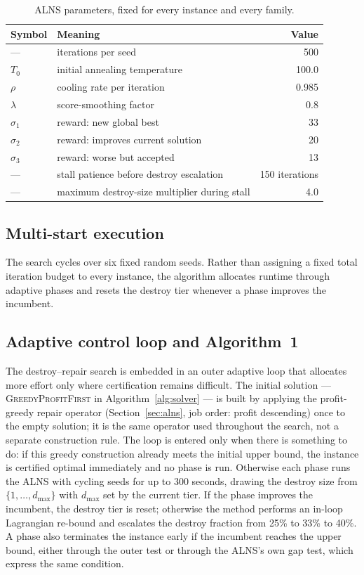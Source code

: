 \documentclass[preprint,12pt]{elsarticle}
\begin{document}
\begin{table}[h]
\centering
\caption{ALNS parameters, fixed for every instance and every family.}
\label{tab:alnsparams}
\begin{tabular}{llr}
\toprule
Symbol & Meaning & Value \\
\midrule
--- & iterations per seed & 500 \\
$T_0$ & initial annealing temperature & 100.0 \\
$\rho$ & cooling rate per iteration & 0.985 \\
$\lambda$ & score-smoothing factor & 0.8 \\
$\sigma_1$ & reward: new global best & 33 \\
$\sigma_2$ & reward: improves current solution & 20 \\
$\sigma_3$ & reward: worse but accepted & 13 \\
--- & stall patience before destroy escalation & 150 iterations \\
--- & maximum destroy-size multiplier during stall & 4.0 \\
\bottomrule
\end{tabular}
\end{table}

\subsection{Multi-start execution}

The search cycles over six fixed random seeds. Rather than assigning a fixed total iteration budget to every instance, the algorithm allocates runtime through adaptive phases and resets the destroy tier whenever a phase improves the incumbent.

\subsection{Adaptive control loop and Algorithm~1}

The destroy--repair search is embedded in an outer adaptive loop that allocates more effort only where certification remains difficult. The initial solution --- \textsc{GreedyProfitFirst} in Algorithm~\ref{alg:solver} --- is built by applying the profit-greedy repair operator (Section~\ref{sec:alns}, job order: profit descending) once to the empty solution; it is the same operator used throughout the search, not a separate construction rule. The loop is entered only when there is something to do: if this greedy construction already meets the initial upper bound, the instance is certified optimal immediately and no phase is run. Otherwise each phase runs the ALNS with cycling seeds for up to 300 seconds, drawing the destroy size from $\{1,\dots,d_{\max}\}$ with $d_{\max}$ set by the current tier. If the phase improves the incumbent, the destroy tier is reset; otherwise the method performs an in-loop Lagrangian re-bound and escalates the destroy fraction from 25\% to 33\% to 40\%. A phase also terminates the instance early if the incumbent reaches the upper bound, either through the outer test or through the ALNS's own gap test, which express the same condition.
\end{document}
